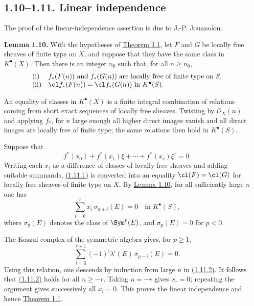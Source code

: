 \subsection*{1.10--1.11. Linear independence}
The proof of the linear-independence assertion is due to J.-P. Jouanolou.

\textbf{Lemma 1.10.} With the hypotheses of \hyperlink{sga6.e06.thm.1-1}{Theorem 1.1}, let \(F\) and \(G\) be locally free sheaves of finite type on \(X\), and suppose that they have the same class in \(K^\bullet(X)\). Then there is an integer \(n_0\) such that, for all \(n\geq n_0\),
\[
\begin{array}{ll}
\text{\rm (i)}& f_*(F(n))\text{ and }f_*(G(n))\text{ are locally free of finite type on }S,\\
\text{\rm (ii)}& \cl f_*(F(n))=\cl f_*(G(n))\text{ in }K^\bullet(S).
\end{array}
\]

An equality of classes in \(K^\bullet(X)\) is a finite integral combination of relations coming from short exact sequences of locally free sheaves. Twisting by \(\mathcal O_X(n)\) and applying \(f_*\), for \(n\) large enough all higher direct images vanish and all direct images are locally free of finite type; the same relations then hold in \(K^\bullet(S)\).

Suppose that
\begin{equation}\tag{1.11.1}
  f^*(x_0)+f^*(x_1)\xi+\cdots+f^*(x_r)\xi^r=0 .
\end{equation}
Writing each \(x_i\) as a difference of classes of locally free sheaves and adding suitable summands, \hyperlink{sga6.e06.eq.1-11-1}{(1.11.1)} is converted into an equality \(\cl(F)=\cl(G)\) for locally free sheaves of finite type on \(X\). By \hyperlink{sga6.e06.lem.1-10}{Lemma 1.10}, for all sufficiently large \(n\) one has
\begin{equation}\tag{1.11.2}
  \sum_{i=0}^{r} x_i\,\sigma_{n+i}(E)=0
  \quad\text{in }K^\bullet(S),
\end{equation}
where \(\sigma_p(E)\) denotes the class of \(\Sym^p(E)\), and \(\sigma_p(E)=0\) for \(p<0\).

The Koszul complex of the symmetric algebra gives, for \(p\geq 1\),
\begin{equation}\tag{1.11.3}
  \sum_{i=0}^{r+1}(-1)^i\lambda^i(E)\,\sigma_{p-i}(E)=0 .
\end{equation}
Using this relation, one descends by induction from large \(n\) in \hyperlink{sga6.e06.eq.1-11-2}{(1.11.2)}. It follows that \hyperlink{sga6.e06.eq.1-11-2}{(1.11.2)} holds for all \(n\geq -r\). Taking \(n=-r\) gives \(x_r=0\); repeating the argument gives successively all \(x_i=0\). This proves the linear independence and hence \hyperlink{sga6.e06.thm.1-1}{Theorem 1.1}.

